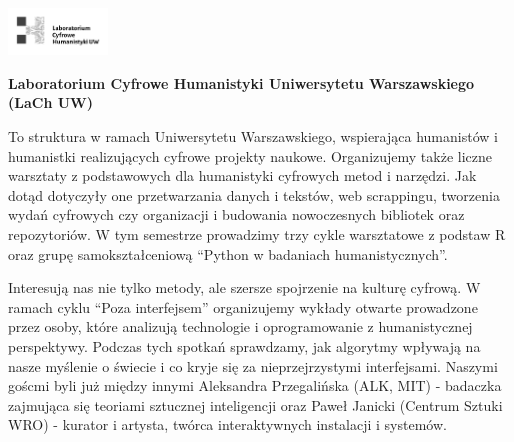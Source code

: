 \documentclass[\main/boa.tex]{subfiles}
\begin{document}
	
	\begin{minipage}[t]{0.915\textwidth}
		\center     
		\includegraphics[width=100px]{img/logos.bw/lach.png} 
	\end{minipage}
	
	\Large \textbf {Laboratorium Cyfrowe Humanistyki Uniwersytetu Warszawskiego (LaCh UW)}
	
	
	\vskip 0.3cm
	\normalsize 
	To struktura w ramach Uniwersytetu Warszawskiego, wspierająca humanistów i humanistki realizujących cyfrowe projekty naukowe. Organizujemy także liczne warsztaty z podstawowych dla humanistyki cyfrowych metod i narzędzi. Jak dotąd dotyczyły one przetwarzania danych i tekstów, web scrappingu, tworzenia wydań cyfrowych czy organizacji i budowania nowoczesnych bibliotek oraz repozytoriów. W tym semestrze prowadzimy trzy cykle warsztatowe z podstaw R oraz grupę samokształceniową “Python w badaniach humanistycznych”.
	
	Interesują nas nie tylko metody, ale szersze spojrzenie na kulturę cyfrową. W ramach cyklu “Poza interfejsem” organizujemy wykłady otwarte prowadzone przez osoby, które analizują technologie i oprogramowanie z humanistycznej perspektywy. Podczas tych spotkań sprawdzamy, jak algorytmy wpływają na nasze myślenie o świecie i co kryje się za nieprzejrzystymi interfejsami. Naszymi goścmi byli już między innymi Aleksandra Przegalińska (ALK, MIT) - badaczka zajmująca się teoriami sztucznej inteligencji oraz Paweł Janicki (Centrum Sztuki WRO) - kurator i artysta, twórca interaktywnych instalacji i systemów.
	
	\vskip 1.5cm
\end{document}
